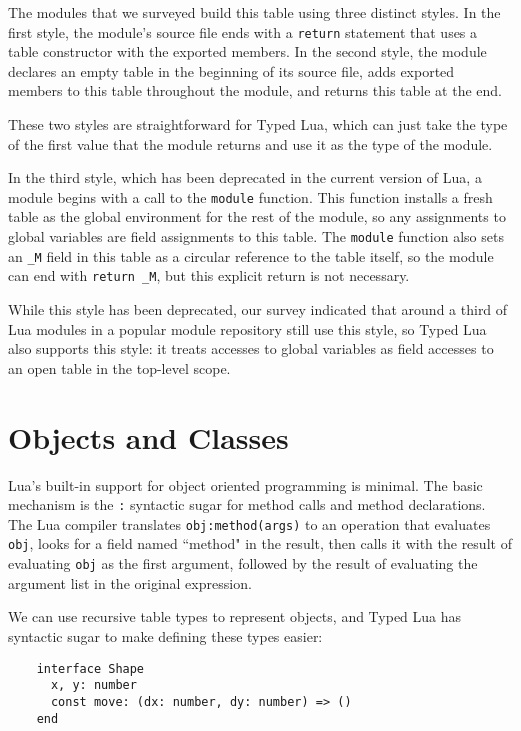 \documentclass[preprint]{sig-alternate}
\begin{document}
The modules that we surveyed build this table using
three distinct styles. In the first style, the module's
source file ends
with a {\tt return} statement that uses a table constructor
with the exported members. In the second style, the
module declares an empty table in the beginning of its
source file, adds exported members to this table
throughout the module, and returns this table at the end.

These two styles are straightforward for Typed Lua, which
can just take the type of the first value that the module
returns and use it as the type of the module.

In the third style, which has been deprecated in the current
version of Lua, a module begins with a call to the {\tt module}
function. This function installs a fresh table as the
global environment for the rest of the module, so any
assignments to global variables are field assignments to
this table. The {\tt module} function also sets an {\tt \_M}
field in this table as a circular reference to the table
itself, so the module can end with {\tt return \_M}, but
this explicit return is not necessary.

While this style has been deprecated, our survey indicated
that around a third of Lua modules in a popular module
repository still use this style, so Typed Lua also
supports this style: it treats accesses to global
variables as field accesses to an open table
in the top-level scope.

\section{Objects and Classes}
\label{sec:classes}

Lua's built-in support for object oriented programming is
minimal. The basic mechanism is the {\tt :} syntactic
sugar for method calls and method declarations.
The Lua compiler translates {\tt obj:method(args)}
to an operation that evaluates {\tt obj}, looks
for a field named ``method" in the result, then calls
it with the result of evaluating {\tt obj} as the
first argument, followed by the result of evaluating
the argument list in the original expression.

We can use recursive table types to represent objects,
and Typed Lua has syntactic sugar to make defining these
types easier:

\begin{verbatim}
    interface Shape
      x, y: number
      const move: (dx: number, dy: number) => ()
    end
\end{verbatim}
\end{document}
